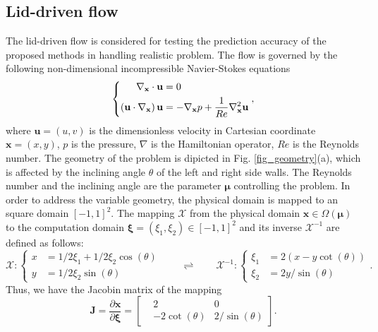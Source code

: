 \documentclass[preprint, 10pt]{elsarticle}
\begin{document}
\subsection{Lid-driven flow}
The lid-driven flow is considered for testing the prediction accuracy of the proposed methods in handling realistic problem.
The flow is governed by the following non-dimensional incompressible Navier-Stokes equations
\begin{equation}
\left \{
\begin{aligned}
\nabla_{\mathbf{x}}  \cdot {\bf{u}} &= 0 \\
\left( {{\bf{u}} \cdot \nabla_{\mathbf{x}} } \right){\bf{u}} &=  - \nabla_{\mathbf{x}} p + \frac{1}{Re}{\nabla_{\mathbf{x}} ^2}{\bf{u}}
\end{aligned}
\right .
,
\label{eq_GoverningEqsLidDriven}
\end{equation}
where $\mathbf{u}=(u,v)$ is the dimensionless velocity in Cartesian coordinate $\mathbf{x}=(x,y)$, $p$ is the pressure, $\nabla$ is the  Hamiltonian operator, $Re$ is the Reynolds number.  The geometry of the problem is dipicted in Fig. \ref{fig_geometry}(a), which is affected by  the inclining angle $\theta$ of the left and right side walls. The Reynolds number and the inclining angle are the parameter $\pmb {\mu} $ controlling the problem. In order to address the variable geometry, the physical domain  is mapped to an square domain $[-1,1]^2$. The mapping $\mathcal{X}$ from the physical domain $\mathbf{x} \in \Omega\left(\pmb{\mu}\right)$ to the computation domain $\pmb{ \xi}=(\xi_1, \xi_2) \in [-1,1]^2$  and its inverse $\mathcal{X}^{-1}$ are defined as follows:
\begin{equation}
\mathcal{X}:
\left \{
\begin{aligned}
x &= 1/2 \xi_1 + 1/2 \xi_2 \cos(\theta)\\
y &= 1/2 \xi_2 \sin(\theta)
\end{aligned}
\right .
\qquad
\rightleftharpoons
\qquad
\mathcal{X}^{-1}:
\left \{
\begin{aligned}
\xi_1 &= 2(x-y \cot(\theta))\\
\xi_2 &= 2y/\sin(\theta)
\end{aligned}
\right . .
\end{equation}
Thus, we have the Jacobin matrix of the mapping
\begin{equation}
\mathbf{J} = \frac{\partial \mathbf{x}}{\partial \pmb{\xi}}
           =
\begin{bmatrix}
 &2             & 0\\
 &-2\cot(\theta)&2/\sin(\theta)
\end{bmatrix}.
\label{eq_JacLidDriven}
\end{equation}
\end{document}
